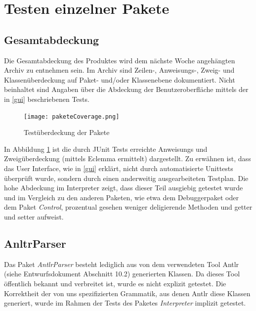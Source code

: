 \documentclass[parskip=full]{scrartcl}
\begin{document}
\newpage
\section{Testen einzelner Pakete}\label{einzelnePakete}

\subsection{Gesamtabdeckung}\label{abdeckung}
Die Gesamtabdeckung des Produktes wird dem nächste Woche angehängten Archiv zu entnehmen sein.
Im Archiv sind Zeilen-, Anweisungs-, Zweig- und Klassenüberdeckung auf Paket- und/oder Klassenebene dokumentiert.
Nicht beinhaltet sind Angaben über die Abdeckung der Benutzeroberfläche mittels der in \ref{gui} beschriebenen Tests.
\begin{figure}[!h]
\centering
\texttt{[image: paketeCoverage.png]}
\caption{Testüberdeckung der Pakete}\label{AbdeckungPakete}
\end{figure}

In Abbildung \ref{AbdeckungPakete} ist die durch JUnit Tests erreichte Anweisungs und Zweigüberdeckung (mittels Eclemma ermittelt) dargestellt. Zu erwähnen ist, dass das User Interface, wie in \ref{gui} erklärt, nicht durch automatisierte Unittests überprüft wurde, sondern durch einen anderweitig ausgearbeiteten Testplan. Die hohe Abdeckung im Interpreter zeigt, dass dieser Teil ausgiebig getestet wurde und im Vergleich zu den anderen Paketen, wie etwa dem Debuggerpaket oder dem Paket \textit{Control}, prozentual gesehen weniger deligierende Methoden und getter und setter aufweist.
\subsection{AnltrParser}\label{ANTLRPARSER}
Das Paket \textit{AntlrParser} besteht lediglich aus von dem verwendeten Tool Antlr (siehe Entwurfsdokument Abschnitt 10.2) generierten Klassen. Da dieses Tool öffentlich bekannt und verbreitet ist, wurde es nicht explizit getestet. Die Korrektheit der von uns spezifizierten Grammatik, aus denen Antlr diese Klassen generiert, wurde im Rahmen der Tests des Paketes \textit{Interpreter} implizit getestet.
\end{document}
